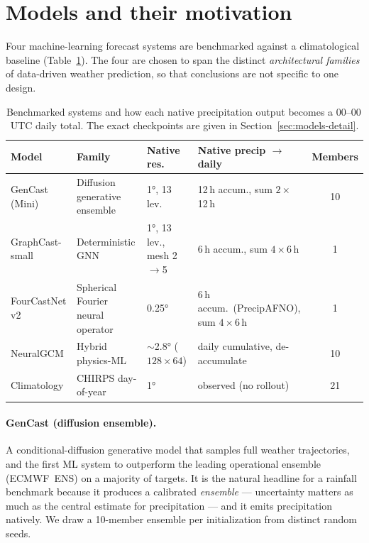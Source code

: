 \documentclass[11pt]{article}
\begin{document}
\section{Models and their motivation}

Four machine-learning forecast systems are benchmarked against a climatological
baseline (Table~\ref{tab:models}). The four are chosen to span the distinct
\emph{architectural families} of data-driven weather prediction, so that
conclusions are not specific to one design.

\begin{table}[t]
\centering
\small
\begin{tabular}{@{}p{2.5cm}p{3.0cm}p{2.3cm}p{3.0cm}c@{}}
\toprule
\textbf{Model} & \textbf{Family} & \textbf{Native res.} &
\textbf{Native precip $\to$ daily} & \textbf{Members}\\
\midrule
GenCast (Mini) & Diffusion generative ensemble & \ang{1}, 13 lev. &
  12\,h accum., sum $2\times$12\,h & 10\\
GraphCast-small & Deterministic GNN & \ang{1}, 13 lev., mesh 2$\to$5 &
  6\,h accum., sum $4\times$6\,h & 1\\
FourCastNet v2 & Spherical Fourier neural operator & \ang{0.25} &
  6\,h accum.\ (PrecipAFNO), sum $4\times$6\,h & 1\\
NeuralGCM & Hybrid physics-ML & $\sim$\ang{2.8} ($128{\times}64$) &
  daily cumulative, de-accumulate & 10\\
Climatology & CHIRPS day-of-year & \ang{1} & observed (no rollout) & 21\\
\bottomrule
\end{tabular}
\caption{Benchmarked systems and how each native precipitation output becomes a
00--00\,UTC daily total. The exact checkpoints are given in
Section~\ref{sec:models-detail}.}
\label{tab:models}
\end{table}

\paragraph{GenCast (diffusion ensemble).} A conditional-diffusion generative
model that samples full weather trajectories, and the first ML system to
outperform the leading operational ensemble (ECMWF~ENS) on a majority of
targets. It is the natural headline for a rainfall benchmark because it produces
a calibrated \emph{ensemble} --- uncertainty matters as much as the central
estimate for precipitation --- and it emits precipitation natively. We draw a
10-member ensemble per initialization from distinct random seeds.
\end{document}

